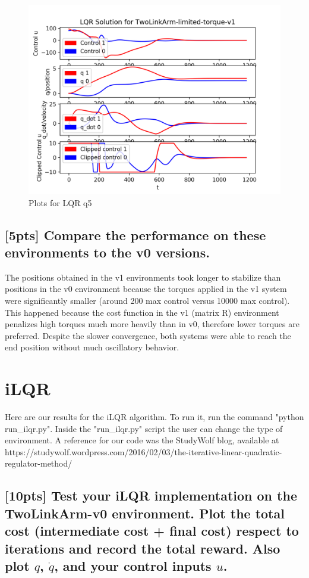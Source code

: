 \documentclass{article}
\begin{document}
\begin{figure}[H] \label{fig:lqr_qn5}
  \centering
  \includegraphics[width=1.2\textwidth]{images/lqr_qn5}
  \caption{Plots for LQR q5}
\end{figure}

\subsection{[5pts] Compare the performance on these environments to the v0 versions.}

The positions obtained in the v1 environments took longer to stabilize than positions in the v0 environment because the torques applied in the v1 system were significantly smaller (around 200 max control versus 10000 max control). This happened because the cost function in the v1 (matrix R) environment penalizes high torques much more heavily than in v0, therefore lower torques are preferred. Despite the slower convergence, both systems were able to reach the end position without much oscillatory behavior.


\section{iLQR}
Here are our results for the iLQR algorithm. To run it, run the command "python run\_ilqr.py". Inside the "run\_ilqr.py" script the user can change the type of environment. 
A reference for our code was the StudyWolf blog, available at https://studywolf.wordpress.com/2016/02/03/the-iterative-linear-quadratic-regulator-method/

\subsection{[10pts] Test your iLQR implementation on the TwoLinkArm-v0 environment. Plot the total cost (intermediate cost + final cost) respect to iterations and record the total reward. Also plot $q$, $\dot{q}$, and your control inputs $u$.}
\end{document}
